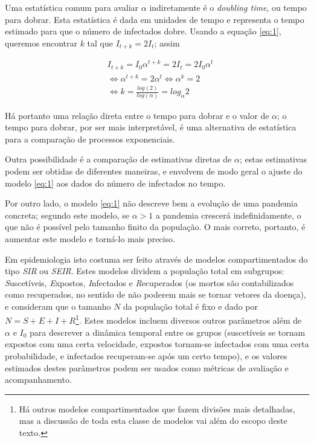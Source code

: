 \documentclass[12pt]{extarticle}
\begin{document}
Uma estatística comum para avaliar $\alpha$ indiretamente é o \textit{doubling time}, ou tempo para dobrar. Esta estatística é dada em unidades de tempo e representa o tempo estimado para que o número de infectados dobre. Usando a equação \ref{eq:1}, queremos encontrar $k$ tal que $I_{t+k} = 2I_t$; assim

\begin{align*}
& I_{t+k} = I_0 \alpha^{t+k} = 2I_t = 2I_0 \alpha^{t} \\
& \iff \alpha^{t+k} = 2\alpha^t \iff \alpha^k = 2 \\
& \iff k = \frac{log(2)}{log(\alpha)} = log_\alpha 2
\end{align*}

Há portanto uma relação direta entre o tempo para dobrar e o valor de $\alpha$; o tempo para dobrar, por ser mais interpretável, é uma alternativa de estatística para a comparação de processos exponenciais.

Outra possibilidade é a comparação de estimativas diretas de $\alpha$; estas estimativas podem ser obtidas de diferentes maneiras, e envolvem de modo geral o ajuste do modelo \ref{eq:1} aos dados do número de infectados no tempo.

Por outro lado, o modelo \ref{eq:1} não descreve bem a evolução de uma pandemia concreta; segundo este modelo, se $\alpha > 1$ a pandemia crescerá indefinidamente, o que não é possível pelo tamanho finito da população. O mais correto, portanto, é aumentar este modelo e torná-lo mais preciso.

Em epidemiologia isto costuma ser feito através de modelos compartimentados do tipo \textit{SIR} ou \textit{SEIR}. Estes modelos dividem a população total em subgrupos: \textit{S}uscetíveis, \textit{E}xpostos, \textit{I}nfectados e \textit{R}ecuperados (os mortos são contabilizados como recuperados, no sentido de não poderem mais se tornar vetores da doença), e consideram que o tamanho $N$ da população total é fixo e dado por $N = S + E + I + R$\footnote{Há outros modelos compartimentados que fazem divisões mais detalhadas, mas a discussão de toda esta classe de modelos vai além do escopo deste texto.}. Estes modelos incluem diversos outros parâmetros além de $\alpha$ e $I_0$ para descrever a dinâmica temporal entre os grupos (suscetíveis se tornam expostos com uma certa velocidade, expostos tornam-se infectados com uma certa probabilidade, e infectados recuperam-se após um certo tempo), e os valores estimados destes parâmetros podem ser usados como métricas de avaliação e acompanhamento.
\end{document}
